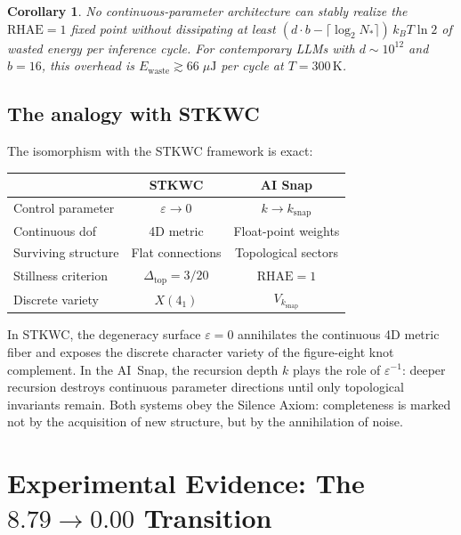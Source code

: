 \documentclass[reprint, aps, prl, amsmath, amssymb, floatfix]{revtex4-2}
\newcommand{\eps}{\varepsilon}
\newcommand{\RHAE}{\mathrm{RHAE}}
\newtheorem{corollary}[theorem]{Corollary}
\begin{document}
\begin{corollary}
No continuous-parameter architecture can stably realize the
$\RHAE = 1$ fixed point without dissipating at least
$(d \cdot b - \lceil\log_2 N_*\rceil)\,k_B T \ln 2$ of wasted
energy per inference cycle. For contemporary LLMs with
$d \sim 10^{12}$ and $b = 16$, this overhead is
$E_{\mathrm{waste}} \gtrsim 66\;\mu\mathrm{J}$ per cycle at
$T = 300\,\mathrm{K}$.
\end{corollary}

\subsection{The analogy with STKWC}

The isomorphism with the STKWC framework is exact:

\smallskip
\begin{center}
\begin{tabular}{@{}lcc@{}}
\toprule
& \textbf{STKWC} & \textbf{AI Snap} \\
\midrule
Control parameter & $\eps \to 0$ & $k \to k_{\mathrm{snap}}$ \\
Continuous dof & 4D metric & Float-point weights \\
Surviving structure & Flat connections & Topological sectors \\
Stillness criterion & $\Delta_{\mathrm{top}} = 3/20$ & $\RHAE = 1$ \\
Discrete variety & $X(4_1)$ & $V_{k_{\mathrm{snap}}}$ \\
\bottomrule
\end{tabular}
\end{center}
\smallskip

\noindent
In STKWC, the degeneracy surface $\eps = 0$ annihilates the
continuous 4D metric fiber and exposes the discrete character
variety of the figure-eight knot complement. In the AI~Snap, the
recursion depth $k$ plays the role of $\eps^{-1}$: deeper recursion
destroys continuous parameter directions until only topological
invariants remain. Both systems obey the Silence Axiom:
completeness is marked not by the acquisition of new structure,
but by the annihilation of noise.


\section{Experimental Evidence: The \texorpdfstring{$8.79 \to 0.00$}{8.79 → 0.00} Transition}\label{sec:evidence}
\end{document}
